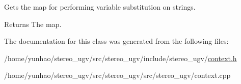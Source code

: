 Gets the map for performing variable substitution on strings. 

\begin{DoxyReturn}{Returns}
The map. 
\end{DoxyReturn}


The documentation for this class was generated from the following files\+:\begin{DoxyCompactItemize}
\item 
/home/yunhao/stereo\+\_\+ugv/src/stereo\+\_\+ugv/include/stereo\+\_\+ugv/\hyperlink{context_8h}{context.\+h}\item 
/home/yunhao/stereo\+\_\+ugv/src/stereo\+\_\+ugv/src/stereo\+\_\+ugv/context.\+cpp\end{DoxyCompactItemize}
